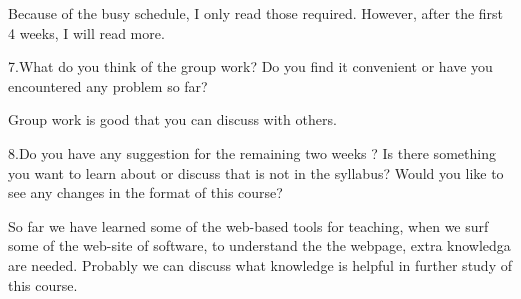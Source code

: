     Because of the busy schedule, I only read those required. However,
after the first 4 weeks, I will read more.

  7.What do you think of the group work? Do you find it convenient or
have you encountered any problem so far?

    Group work is good that you can discuss with others.

  8.Do you have any suggestion for the remaining two weeks ? Is there
something you want to learn about or discuss that is not in the
syllabus? Would you
    like to see any changes in the format of this course?

    So far we have learned some of the web-based tools for teaching,
when we surf some of the web-site of software, to understand the the
webpage,
    extra knowledga are needed. Probably we can discuss what knowledge
is helpful in further study of this course.


